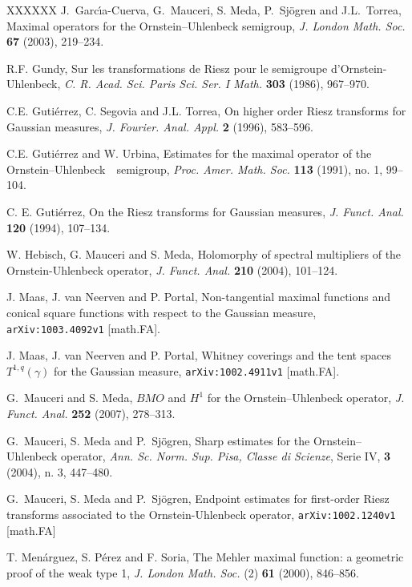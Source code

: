\documentclass{amsart}                 %
\numberwithin{equation}{section}
\newcommand\1{{\bf 1}}
\newcommand\OU{{Ornstein--Uhlenbeck}\ }
\begin{document}
\begin{thebibliography}{XXXXXX}
J.~Garc{\'\i}a-Cuerva, G.~Mauceri, S. Meda, P.~Sj\"ogren and 
J.L.~Torrea,
{Maximal operators for the Ornstein--Uhlenbeck semigroup},
\emph{J. London Math. Soc.} \textbf{67} (2003), 219--234.

 R.F. Gundy,
{Sur les transformations de Riesz pour le semigroupe d'Ornstein-
Uhlenbeck,}
\emph{C. R. Acad. Sci. Paris Sci. Ser. I Math.} \textbf{303} (1986), 
967--970.


 C.E. Guti\'errez, C. Segovia and J.L. Torrea,
{On higher order Riesz transforms for Gaussian
measures},
\emph{J. Fourier. Anal. Appl.} \textbf{2} (1996), 583--596.

 C.E. Guti\'errez and W. Urbina, 
{Estimates for the maximal operator of the \OU\ semigroup}, 
\emph{Proc. Amer. Math. Soc.}
\textbf{113} (1991), no. 1, 99--104.

 C. E. Guti\'errez,
{On the Riesz transforms for Gaussian measures},
\emph{J. Funct. Anal.} \textbf{120} (1994), 107--134.

 W. Hebisch, G. Mauceri and S. Meda,
{Holomorphy of spectral multipliers of the Ornstein-Uhlenbeck 
operator},
\emph{J. Funct. Anal.} \textbf{210} (2004), 101--124.

 J. Maas, J. van Neerven and P. Portal, {Non-tangential maximal functions  
and conical \break  square functions with respect to the Gaussian measure}, {\tt 	arXiv:1003.4092v1} [math.FA]. 

 J. Maas, J. van Neerven and P. Portal, {Whitney coverings and the tent spaces 
$T^{1,q}(\gamma)$ for the Gaussian measure},  {\tt 	arXiv:1002.4911v1}  [math.FA].

G.~Mauceri and S. Meda,
$BMO$ and $H^1$ for the Ornstein--Uhlenbeck operator,
\emph{J. Funct. Anal.} \textbf{252} (2007), 278--313.

G.~Mauceri, S. Meda and P.~Sj\"ogren,
Sharp estimates for the Ornstein--Uhlenbeck operator,
\emph{Ann. Sc. Norm. Sup. Pisa, Classe di Scienze}, Serie IV,
\textbf{3} (2004), n. 3, 447--480.

G.~Mauceri, S. Meda and P.~Sj\"ogren,
Endpoint estimates for first-order Riesz transforms associated to the 
Ornstein-Uhlenbeck operator, 	{\tt arXiv:1002.1240v1}  [math.FA]

 T. Men\'arguez, S. P\'erez and F. Soria,
{The Mehler maximal function: a geometric proof
of the weak type 1}, 
\emph{J. London Math. Soc.} (2) \textbf{61} (2000), 846--856.


\end{thebibliography}
\end{document}
